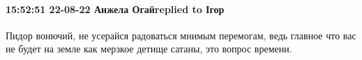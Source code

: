  
 
 
 
 

\paragraph{15:52:51 22-08-22 Анжела Огайreplied to Ігор}

Пидор вонючий, не усерайся радоваться мнимым перемогам, ведь главное что вас не будет на земле как мерзкое детище сатаны, это вопрос времени.
